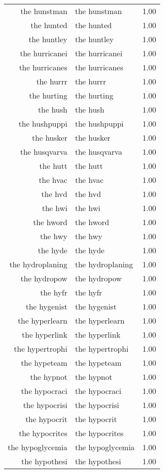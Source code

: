 \begin{table}[ht]
\begin{tabular}{rlr}
  the hunstman & the hunstman & 1.00 \\ 
  the hunted & the hunted & 1.00 \\ 
  the huntley & the huntley & 1.00 \\ 
  the hurricanei & the hurricanei & 1.00 \\ 
  the hurricanes & the hurricanes & 1.00 \\ 
  the hurrr & the hurrr & 1.00 \\ 
  the hurting & the hurting & 1.00 \\ 
  the hush & the hush & 1.00 \\ 
  the hushpuppi & the hushpuppi & 1.00 \\ 
  the husker & the husker & 1.00 \\ 
  the husqvarva & the husqvarva & 1.00 \\ 
  the hutt & the hutt & 1.00 \\ 
  the hvac & the hvac & 1.00 \\ 
  the hvd & the hvd & 1.00 \\ 
  the hwi & the hwi & 1.00 \\ 
  the hword & the hword & 1.00 \\ 
  the hwy & the hwy & 1.00 \\ 
  the hyde & the hyde & 1.00 \\ 
  the hydroplaning & the hydroplaning & 1.00 \\ 
  the hydropow & the hydropow & 1.00 \\ 
  the hyfr & the hyfr & 1.00 \\ 
  the hygenist & the hygenist & 1.00 \\ 
  the hyperlearn & the hyperlearn & 1.00 \\ 
  the hyperlink & the hyperlink & 1.00 \\ 
  the hypertrophi & the hypertrophi & 1.00 \\ 
  the hypeteam & the hypeteam & 1.00 \\ 
  the hypnot & the hypnot & 1.00 \\ 
  the hypocraci & the hypocraci & 1.00 \\ 
  the hypocrisi & the hypocrisi & 1.00 \\ 
  the hypocrit & the hypocrit & 1.00 \\ 
  the hypocrites & the hypocrites & 1.00 \\ 
  the hypoglycemia & the hypoglycemia & 1.00 \\ 
  the hypothesi & the hypothesi & 1.00 \\ 

\end{tabular}
\end{table}
